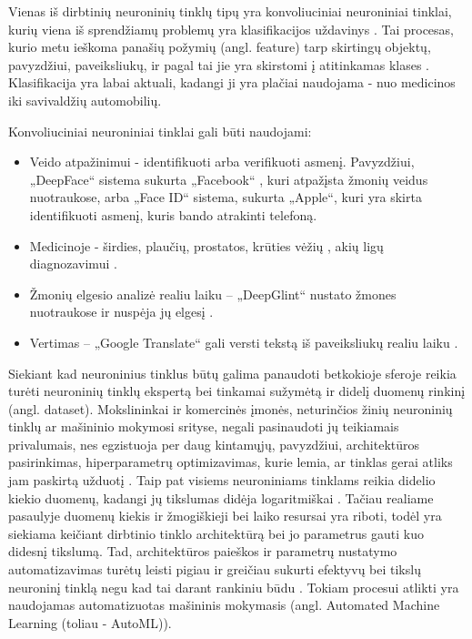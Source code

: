 \documentclass{VUMIFPSbakalaurinis}
\begin{document}

\tableofcontents


Vienas iš dirbtinių neuroninių tinklų tipų yra konvoliuciniai neuroniniai tinklai, kurių viena iš sprendžiamų problemų yra klasifikacijos uždavinys \cite{fukushima, LeCun:1999:ORG:646469.691875}. 
Tai procesas, kurio metu ieškoma panašių požymių (angl. feature) tarp skirtingų objektų, pavyzdžiui, 
paveiksliukų, ir pagal tai jie yra skirstomi į atitinkamas klases \cite{classificationDef}. Klasifikacija yra labai aktuali, kadangi ji yra plačiai naudojama -
nuo medicinos iki savivaldžių automobilių. 

Konvoliuciniai neuroniniai tinklai gali būti naudojami:
\begin{itemize}
    \item Veido atpažinimui - identifikuoti arba verifikuoti asmenį. Pavyzdžiui, „DeepFace“ sistema sukurta „Facebook“ \cite{Taigman:2014:DCG:2679600.2680208}, kuri atpažįsta žmonių veidus nuotraukose, 
arba „Face ID“ sistema, sukurta „Apple“, kuri yra skirta identifikuoti asmenį, kuris bando atrakinti telefoną. 
    \item Medicinoje - širdies, plaučių, prostatos, krūties vėžių \cite{cancer}, akių ligų diagnozavimui \cite{eyedis}.
    \item Žmonių elgesio analizė realiu laiku – „DeepGlint“ nustato žmones nuotraukose ir nuspėja jų elgesį \cite{deepGlint}.
    \item Vertimas – „Google Translate“ gali versti tekstą iš paveiksliukų realiu laiku \cite{Raschka:2015:PML:2886323}.
\end{itemize}

Siekiant kad neuroninius tinklus būtų galima panaudoti betkokioje sferoje reikia turėti neuroninių tinklų ekspertą bei tinkamai sužymėtą ir didelį duomenų rinkinį (angl. dataset). 
Mokslininkai ir komercinės įmonės, neturinčios žinių neuroninių tinklų ar mašininio mokymosi srityse, negali pasinaudoti jų teikiamais privalumais, nes egzistuoja per daug kintamųjų, pavyzdžiui, architektūros pasirinkimas, hiperparametrų optimizavimas, 
kurie lemia, ar tinklas gerai atliks jam paskirtą užduotį \cite{14f00e7a0861477a81f65b5c51f660f4, DBLP:journals/corr/abs-1902-06827}. Taip pat visiems neuroniniams tinklams reikia didelio kiekio duomenų, kadangi jų tikslumas didėja logaritmiškai \cite{DBLP:journals/corr/ChoLSCD15, DBLP:journals/corr/SunSSG17}. 
Tačiau realiame pasaulyje duomenų kiekis ir žmogiškieji bei laiko resursai yra riboti, todėl yra siekiama keičiant dirbtinio tinklo architektūrą bei jo parametrus gauti kuo didesnį tikslumą. Tad, architektūros paieškos ir parametrų 
nustatymo automatizavimas turėtų leisti pigiau ir greičiau sukurti efektyvų bei tikslų neuroninį tinklą negu kad tai darant rankiniu būdu \cite{DBLP:journals/corr/RealMSSSLK17}.
Tokiam procesui atlikti yra naudojamas automatizuotas mašininis mokymasis (angl. Automated Machine Learning (toliau - AutoML)).
\end{document}
